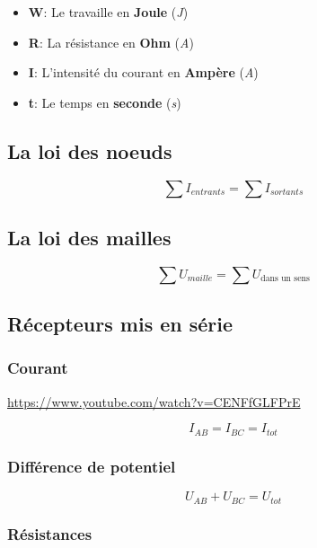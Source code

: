  \begin{itemize}
	 \item \textbf{W}: Le travaille en \textbf{Joule} (\textit{J})
	 \item \textbf{R}: La résistance en \textbf{Ohm} (\textit{A})
	 \item \textbf{I}: L'intensité du courant en \textbf{Ampère} (\textit{A})
	 \item \textbf{t}: Le temps en \textbf{seconde} (\textit{s})
 \end{itemize}

 \subsection{La loi des noeuds}

 \begin{equation}
	 \sum I_{entrants} = \sum I_{sortants}
 \end{equation}

 \subsection{La loi des mailles}

 \begin{equation}
	 \sum U_{maille} = \sum U_{\text{dans un sens}}
 \end{equation}

 \subsection{Récepteurs mis en série}
 \subsubsection{Courant}

 \hyperref[Vidéo exemple]{https://www.youtube.com/watch?v=CENFfGLFPrE}

 \begin{equation}
	 I_{AB} = I_{BC} = I_{tot}
 \end{equation}

 \subsubsection{Différence de potentiel}

 \begin{equation}
	 U_{AB} + U_{BC} = U_{tot}
 \end{equation}

 \subsubsection{Résistances}

